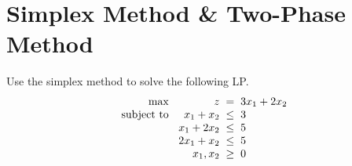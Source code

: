 \documentclass[a4paper, 10pt]{article}
\begin{document}
\subject[2110203 - Computer Engineering Mathematics II]


\section{Simplex Method \& Two-Phase Method}


\begin{problem}
Use the simplex method to solve the following LP.
\[
\begin{array}{@{\hspace{2mm}} r @{\hspace{2mm}} r @{\hspace{2mm}} c @{\hspace{2mm}} l}
    \text{max } & z & = & 3x_1 + 2x_2 \\
    \text{subject to } & x_1 + x_2 & \leq & 3 \\
    & x_1 + 2x_2 & \leq & 5 \\
    & 2x_1 + x_2 & \leq & 5 \\
    & x_1, x_2 & \geq & 0
\end{array}
\]
\end{problem}
\end{document}
